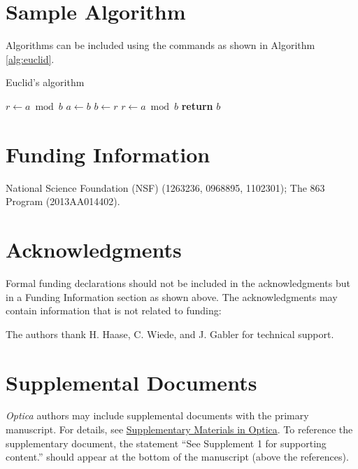 \documentclass[9pt,twocolumn,twoside]{optica}
\begin{document}
\section{Sample Algorithm}

Algorithms can be included using the commands as shown in Algorithm \ref{alg:euclid}.

\begin{algorithm}
\caption{Euclid’s algorithm}\label{alg:euclid}
\begin{algorithmic}[1]
\State $r\gets a\bmod b$
\State $a\gets b$
\State $b\gets r$
\State $r\gets a\bmod b$
\EndWhile\label{euclidendwhile}
\State \textbf{return} $b$
\EndProcedure
\end{algorithmic}
\end{algorithm}

\section*{Funding Information}
National Science Foundation (NSF) (1263236, 0968895, 1102301); The 863 Program (2013AA014402).

\section*{Acknowledgments}

Formal funding declarations should not be included in the acknowledgments but in a Funding Information section as shown above. The acknowledgments may contain information that is not related to funding:

The authors thank H. Haase, C. Wiede, and J. Gabler for technical support.

\section*{Supplemental Documents}
\emph{Optica} authors may include supplemental documents with the primary manuscript. For details, see \href{http://www.opticsinfobase.org/submit/style/supplementary-materials-optica.cfm}{Supplementary Materials in Optica}. To reference the supplementary document, the statement ``See Supplement 1 for supporting content.'' should appear at the bottom of the manuscript (above the references).

\end{document}
